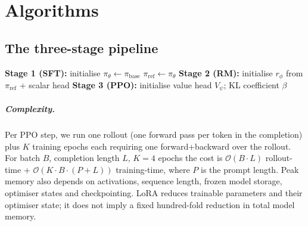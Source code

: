 \documentclass[11pt,oneside]{scrbook}
\begin{document}
\chapter{Algorithms}

\section{The three-stage pipeline}

\begin{algorithm}[H]
\SetAlgoLined
\DontPrintSemicolon
{}
\textbf{Stage 1 (SFT):} initialise $\pi_\theta \gets \pi_{\text{base}}$ \;
$\pi_{\text{ref}} \gets \pi_\theta$ 
\textbf{Stage 2 (RM):} initialise $r_\phi$ from $\pi_{\text{ref}}$ + scalar head \;
\textbf{Stage 3 (PPO):} initialise value head $V_\psi$; KL coefficient $\beta$ \;
\caption{Three-stage RLHF (InstructGPT-style).}
\label{alg:rlhf}
\end{algorithm}

\paragraph{Complexity.} Per PPO step, we run one rollout (one forward
pass per token in the completion) plus $K$ training epochs each
requiring one forward+backward over the rollout. For batch $B$,
completion length $L$, $K{=}4$ epochs the cost is $\mathcal{O}(B \cdot L)$
rollout-time + $\mathcal{O}(K \cdot B \cdot (P + L))$ training-time, where
$P$ is the prompt length. Peak memory also depends on activations, sequence length, frozen model storage, optimiser states and checkpointing. LoRA reduces trainable parameters and their optimiser state; it does not imply a fixed hundred-fold reduction in total model memory.
\end{document}
